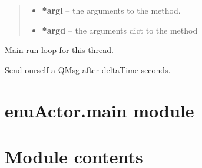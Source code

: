 \documentclass[letterpaper,10pt,english]{sphinxmanual}
\begin{document}
\begin{fulllineitems}
\begin{fulllineitems}
\begin{quote}
\begin{description}
\begin{itemize}
\item {} 
\textbf{*argl} -- the arguments to the method.

\item {} 
\textbf{*argd} -- the arguments dict to the method

\end{itemize}

\end{description}\end{quote}

\end{fulllineitems}


\begin{fulllineitems}
\label{enuActor:enuActor.QThread.QThread.run}
Main run loop for this thread.

\end{fulllineitems}


\begin{fulllineitems}
\label{enuActor:enuActor.QThread.QThread.sendLater}
Send ourself a QMsg after deltaTime seconds.

\end{fulllineitems}


\end{fulllineitems}



\section{enuActor.main module}
\label{enuActor:enuactor-main-module}

\section{Module contents}
\label{enuActor:module-enuActor}\label{enuActor:module-contents}
\end{document}
